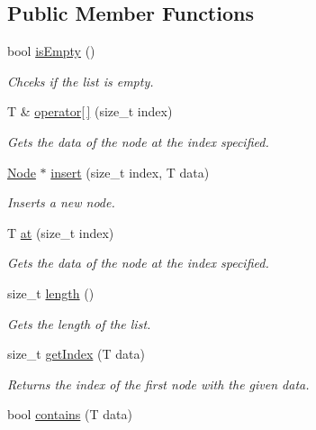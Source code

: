 \subsection*{Public Member Functions}
\begin{DoxyCompactItemize}
\item 
bool \hyperlink{classLinkedList_a7ecbb28e82117a680839ed0dc28ebdce}{is\+Empty} ()
\begin{DoxyCompactList}\small\item\em Chceks if the list is empty. \end{DoxyCompactList}\item 
T \& \hyperlink{classLinkedList_acccbb0e5eaeb88c5a1557fed87131727}{operator\mbox{[}$\,$\mbox{]}} (size\+\_\+t index)
\begin{DoxyCompactList}\small\item\em Gets the data of the node at the index specified. \end{DoxyCompactList}\item 
\hyperlink{structLinkedList_1_1Node}{Node} $\ast$ \hyperlink{classLinkedList_ae5e1ea8a9bbb18d9483db99b44479566}{insert} (size\+\_\+t index, T data)
\begin{DoxyCompactList}\small\item\em Inserts a new node. \end{DoxyCompactList}\item 
T \hyperlink{classLinkedList_a2793ba03677f44075c0529dffe0b0d5a}{at} (size\+\_\+t index)
\begin{DoxyCompactList}\small\item\em Gets the data of the node at the index specified. \end{DoxyCompactList}\item 
size\+\_\+t \hyperlink{classLinkedList_a4b766729a31801b6fafdb6170646d318}{length} ()
\begin{DoxyCompactList}\small\item\em Gets the length of the list. \end{DoxyCompactList}\item 
size\+\_\+t \hyperlink{classLinkedList_ac274901e769cff00d61b52844e96b21e}{get\+Index} (T data)
\begin{DoxyCompactList}\small\item\em Returns the index of the first node with the given data. \end{DoxyCompactList}\item 
bool \hyperlink{classLinkedList_a603e1c5a0a4528d82f83b9393f83bf22}{contains} (T data)

\end{DoxyCompactItemize}
